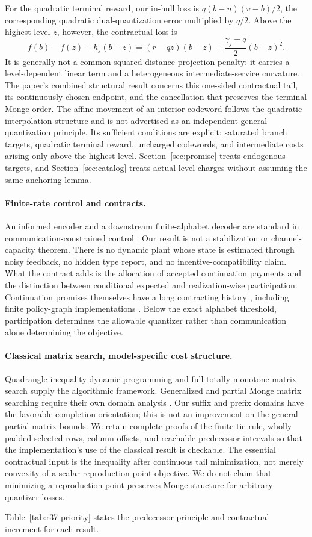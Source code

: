 For the quadratic terminal reward, our in-hull loss is $q(b-u)(v-b)/2$, the corresponding quadratic dual-quantization error multiplied by $q/2$. Above the highest level $z$, however, the contractual loss is
\[
 f(b)-f(z)+h_j(b-z)
 =(r-qz)(b-z)+\frac{\gamma_j-q}{2}(b-z)^2.
\]
It is generally not a common squared-distance projection penalty: it carries a level-dependent linear term and a heterogeneous intermediate-service curvature. The paper's combined structural result concerns this one-sided contractual tail, its continuously chosen endpoint, and the cancellation that preserves the terminal Monge order. The affine movement of an interior codeword follows the quadratic interpolation structure and is not advertised as an independent general quantization principle. Its sufficient conditions are explicit: saturated branch targets, quadratic terminal reward, uncharged codewords, and intermediate costs arising only above the highest level. Section~\ref{sec:promise} treats endogenous targets, and Section~\ref{sec:catalog} treats actual level charges without assuming the same anchoring lemma.

\paragraph{Finite-rate control and contracts.}
An informed encoder and a downstream finite-alphabet decoder are standard in communication-constrained control \citep{Fu2024}. Our result is not a stabilization or channel-capacity theorem. There is no dynamic plant whose state is estimated through noisy feedback, no hidden type report, and no incentive-compatibility claim. What the contract adds is the allocation of accepted continuation payments and the distinction between conditional expected and realization-wise participation. Continuation promises themselves have a long contracting history \citep{SpearSrivastava1987,ThomasWorrall1988}, including finite policy-graph implementations \citep{Zhang2012}. Below the exact alphabet threshold, participation determines the allowable quantizer rather than communication alone determining the objective.

\paragraph{Classical matrix search, model-specific cost structure.}
Quadrangle-inequality dynamic programming \citep{Yao1980} and full totally monotone matrix search \citep{AggarwalEtAl1987} supply the algorithmic framework. Generalized and partial Monge matrix searching require their own domain analysis \citep{KlaweKleitman1990,Chan2021,Kaplan2017}. Our suffix and prefix domains have the favorable completion orientation; this is not an improvement on the general partial-matrix bounds. We retain complete proofs of the finite tie rule, wholly padded selected rows, column offsets, and reachable predecessor intervals so that the implementation's use of the classical result is checkable. The essential contractual input is the inequality after continuous tail minimization, not merely convexity of a scalar reproduction-point objective. We do not claim that minimizing a reproduction point preserves Monge structure for arbitrary quantizer losses.

Table~\ref{tab:r37-priority} states the predecessor principle and contractual increment for each result.

